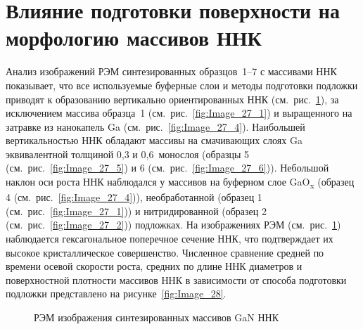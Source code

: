 \section{Влияние подготовки поверхности на морфологию массивов ННК}\label{sec:ch3/sec6}

Анализ изображений РЭМ синтезированных образцов~1--7 с массивами ННК
показывает, что все используемые буферные слои и методы подготовки подложки
приводят к образованию вертикально ориентированных ННК
(см.~рис.~\cref{fig:Image_27}), за исключением массива образца~1
(см.~рис.~\cref{fig:Image_27_1}) и выращенного на затравке из нанокапель Ga
(см.~рис.~\cref{fig:Image_27_4}). Наибольшей вертикальностью ННК обладают
массивы на смачивающих слоях Ga эквивалентной толщиной 0,3 и 0,6~монослоя
(образцы 5 (см.~рис.~\cref{fig:Image_27_5}) и 6
(см.~рис.~\cref{fig:Image_27_6})). Небольшой наклон оси роста ННК наблюдался у
массивов на буферном слое GaO\textsubscript{x} (образец 4
(см.~рис.~\cref{fig:Image_27_4})), необработанной (образец 1
(см.~рис.~\cref{fig:Image_27_1})) и нитридированной (образец 2
(см.~рис.~\cref{fig:Image_27_2})) подложках. На изображениях РЭМ
(см.~рис.~\cref{fig:Image_27}) наблюдается гексагональное поперечное сечение
ННК, что подтверждает их высокое кристаллическое совершенство. Численное
сравнение средней по времени осевой скорости роста, средних по длине ННК
диаметров и поверхностной плотности массивов ННК в зависимости от способа
подготовки подложки представлено на рисунке~\cref{fig:Image_28}.

\begin{figure}[ht] 
			 \caption{РЭМ изображения синтезированных массивов
		GaN ННК}\label{fig:Image_27} \end{figure}

